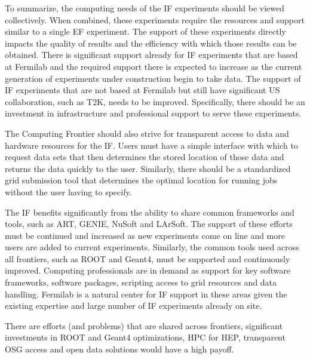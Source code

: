 To summarize, the computing needs of the IF experiments should be viewed collectively.  When combined, these experiments require the resources and support similar to a single EF experiment.  The support of these experiments directly impacts the quality of results and the efficiency with which those results can be obtained.  There is significant support already for IF experiments that are based at Fermilab and the required support there is expected to increase as the current generation of experiments under construction begin to take data.  The support of IF experiments that are not based at Fermilab but still have significant US collaboration, such as T2K, needs to be improved.  Specifically, there should be an investment in infrastructure and professional support to serve these experiments.  

The Computing Frontier should also strive for transparent access to data and hardware resources for the IF.  Users must have a simple interface with which to request data sets that then determines the stored location of those data and returns the data quickly to the user.  Similarly, there should be a standardized grid submission tool that determines the optimal location for running jobs without the user having to specify.  

The IF benefits significantly from the ability to share common frameworks and tools, such as ART, GENIE, NuSoft and LArSoft.  The support of these efforts must be continued and increased as new experiments come on line and more users are added to current experiments.  Similarly, the common tools used across all frontiers, such as ROOT and Geant4, must be supported and continuously improved. Computing professionals are in demand as support for key software frameworks, software packages, scripting access to grid resources and data handling. Fermilab is a natural center for IF support in these areas given the existing expertise and large number of IF experiments already on site. 

There are efforts (and problems) that are shared across frontiers, significant investments in ROOT and Geant4 optimizations, HPC for HEP, transparent OSG access and open data solutions would have a high payoff. 


